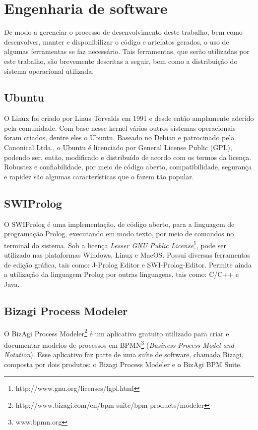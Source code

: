 \section{Engenharia de software}
De modo a gerenciar o processo de desenvolvimento deste trabalho, bem como desenvolver, manter e disponibilizar o código e artefatos gerados, o uso de algumas ferramentas se faz necessário. Tais ferramentas, que serão utilizadas por este trabalho, são brevemente descritas a seguir, bem como a distribuição do sistema operacional utilizada.

\subsection{Ubuntu}
O Linux foi criado por Linus Torvalds em 1991 \cite{torvalds2001just} e desde então amplamente aderido pela comunidade. Com base nesse kernel vários outros sistemas operacionais foram criados, dentre eles o Ubuntu. 
Baseado no Debian e patrocinado pela Canonical Ltda., o Ubuntu é licenciado por General License Public (GPL), podendo ser, então, modificado e distribuído de acordo com os termos da licença. Robustez e confiabilidade, por meio de código aberto, compatibilidade, segurança e rapidez são algumas características que o fazem tão popular. 

\subsection{SWIProlog}
O SWIProlog é uma implementação, de código aberto, para a linguagem de programação Prolog, executando em modo texto, por meio de comandos no terminal do sistema. Sob a licença \textit{Lesser GNU Public License}\footnote{http://www.gnu.org/licenses/lgpl.html}, pode ser utilizado nas plataformas Windows, Linux e MacOS. Possui diversas ferramentas de edição gráfica, tais como: J-Prolog Editor e SWI-Prolog-Editor.
Permite ainda a utilização da linguagem Prolog por outras linguagens, tais como: C/C++ e Java.

\subsection{Bizagi Process Modeler}
O BizAgi Process Modeler\footnote{http://www.bizagi.com/en/bpm-suite/bpm-products/modeler} é um aplicativo gratuito utilizado para criar e documentar modelos de processos em BPMN\footnote{www.bpmn.org} (\textit{Business Process Model and Notation}). Esse aplicativo faz parte de uma suíte de software, chamada Bizagi, composta por dois produtos: o Bizagi Process Modeler e o BizAgi BPM Suite. 

